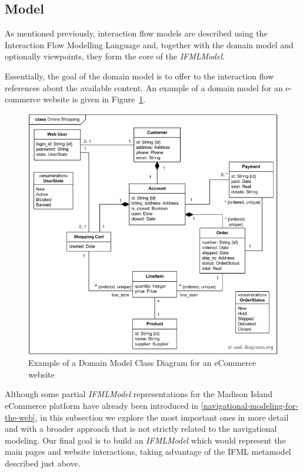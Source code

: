 \subsection{Model}

As mentioned previously, interaction flow models are described using the Interaction Flow Modelling Language and, together with the domain model and optionally viewpoints, they form the core of the \textit{IFMLModel}.

Essentially, the goal of the domain model is to offer to the interaction flow references about the available content. An example of a domain model for an e-commerce website is given in Figure~\ref{fig:domain-model-uml-ecommerce}.

\vspace{0.5cm}
\begin{figure}[H]
  \centering
    \includegraphics[width=12cm]{images/diagrams/domain-model-uml-ecommerce.png}
  \caption{Example of a Domain Model Class Diagram for an eCommerce website}
  \label{fig:domain-model-uml-ecommerce}
\end{figure}
\vspace{0.5cm}

Although some partial \textit{IFMLModel} representations for the Madison Island eCommerce platform have already been introduced in \ref{navigational-modeling-for-the-web}, in this subsection we explore the most important ones in more detail and with a broader approach that is not strictly related to the navigational modeling. Our final goal is to build an \textit{IFMLModel} which would represent the main pages and website interactions, taking advantage of the IFML metamodel described just above.

